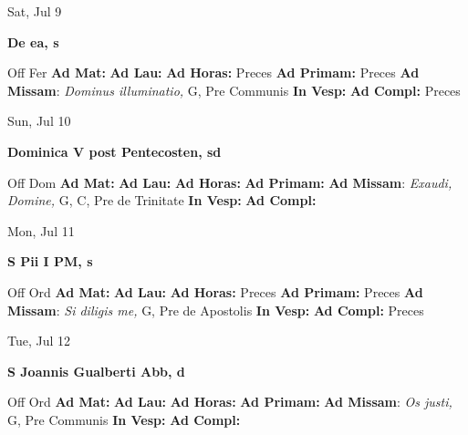 \documentclass[10pt]{article}
\begin{document}
\begin{minipage}{3.5in}
\vspace{2em}\begin{center}
Sat, Jul 9
\end{center}\textbf{ \large De ea, \textnormal{\normalsize s}}
\begin{justify}
Off Fer
\textbf{Ad Mat: }
\textbf{Ad Lau: }
\textbf{Ad Horas: }Preces
\textbf{Ad Primam: }Preces
\textbf{Ad Missam}: \textit{Dominus illuminatio,} G, Pre Communis
\textbf{In Vesp: }
\textbf{Ad Compl: }Preces\end{justify}
\end{minipage}



\begin{minipage}{3.5in}
\vspace{2em}\begin{center}
Sun, Jul 10
\end{center}\textbf{ \large Dominica V post Pentecosten, \textnormal{\normalsize sd}}
\begin{justify}
Off Dom
\textbf{Ad Mat: }
\textbf{Ad Lau: }
\textbf{Ad Horas: }
\textbf{Ad Primam: }
\textbf{Ad Missam}: \textit{Exaudi, Domine,} G, C, Pre de Trinitate
\textbf{In Vesp: }
\textbf{Ad Compl: }\end{justify}
\end{minipage}



\begin{minipage}{3.5in}
\vspace{2em}\begin{center}
Mon, Jul 11
\end{center}\textbf{ \large S Pii I PM, \textnormal{\normalsize s}}
\begin{justify}
Off Ord
\textbf{Ad Mat: }
\textbf{Ad Lau: }
\textbf{Ad Horas: }Preces
\textbf{Ad Primam: }Preces
\textbf{Ad Missam}: \textit{Si diligis me,} G, Pre de Apostolis
\textbf{In Vesp: }
\textbf{Ad Compl: }Preces\end{justify}
\end{minipage}



\begin{minipage}{3.5in}
\vspace{2em}\begin{center}
Tue, Jul 12
\end{center}\textbf{ \large S Joannis Gualberti Abb, \textnormal{\normalsize d}}
\begin{justify}
Off Ord
\textbf{Ad Mat: }
\textbf{Ad Lau: }
\textbf{Ad Horas: }
\textbf{Ad Primam: }
\textbf{Ad Missam}: \textit{Os justi,} G, Pre Communis
\textbf{In Vesp: }
\textbf{Ad Compl: }\end{justify}
\end{minipage}
\end{document}
